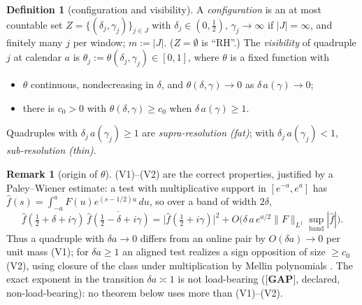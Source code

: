 \documentclass[11pt,reqno]{amsart}
\theoremstyle{definition}
\newtheorem{definition}[theorem]{Definition}
\newtheorem{remark}[theorem]{Remark}
\newcommand{\half}{\tfrac12}
\newcommand{\GAP}{\textbf{[GAP]}}
\begin{document}
\begin{definition}[configuration and visibility]\label{def:config}
A \emph{configuration} is an at most countable set
\(Z=\{(\delta_j,\gamma_j)\}_{j\in J}\) with \(\delta_j\in(0,\half)\),
\(\gamma_j\to\infty\) if \(|J|=\infty\), and finitely many \(j\) per window;
\(m:=|J|\). (\(Z=\emptyset\) is ``RH''.) The \emph{visibility} of quadruple
\(j\) at calendar \(a\) is \(\theta_j:=\theta(\delta_j,\gamma_j)\in[0,1]\),
where \(\theta\) is a fixed function with
\begin{itemize}
\item[\textup{(V1)}] \(\theta\) continuous, nondecreasing in \(\delta\), and
\(\theta(\delta,\gamma)\to0\) as \(\delta\,a(\gamma)\to0\);
\item[\textup{(V2)}] there is \(c_0>0\) with \(\theta(\delta,\gamma)\geq c_0\)
when \(\delta\,a(\gamma)\geq1\).
\end{itemize}
Quadruples with \(\delta_j\,a(\gamma_j)\geq1\) are \emph{supra-resolution (fat)};
with \(\delta_j\,a(\gamma_j)<1\), \emph{sub-resolution (thin)}.
\end{definition}

\begin{remark}[origin of \(\theta\)]\label{rem:theta}
(V1)--(V2) are the correct properties, justified by a Paley--Wiener estimate: a
test with multiplicative support in \([e^{-a},e^a]\) has
\(\hat f(s)=\int_{-a}^{a}F(u)e^{(s-1/2)u}\,du\), so over a band of width
\(2\delta\),
\[
\hat f(\tfrac12+\delta+i\gamma)\,\overline{\hat f(\tfrac12-\delta+i\gamma)}
=\bigl|\hat f(\tfrac12+i\gamma)\bigr|^2
+O\bigl(\delta\,a\,e^{a/2}\|F\|_{L^1}\sup_{\text{band}}|\hat f|\bigr).
\]
Thus a quadruple with \(\delta a\to0\) differs from an online pair by
\(O(\delta a)\to0\) per unit mass (V1); for \(\delta a\geq1\) an aligned test
realizes a sign opposition of size \(\geq c_0\) (V2), using closure of the class
under multiplication by Mellin polynomials \cite{P40}. The exact exponent in the
transition \(\delta a\asymp1\) is not load-bearing (\(\GAP\), declared,
non-load-bearing): no theorem below uses more than (V1)--(V2).
\end{remark}
\end{document}
